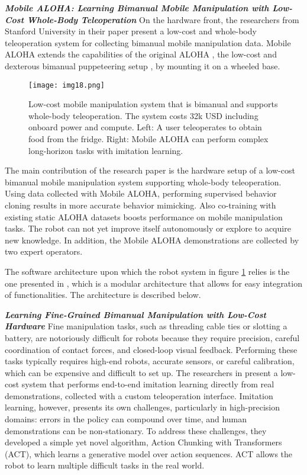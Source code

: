 \textbf{\textit{Mobile ALOHA: Learning Bimanual Mobile Manipulation with
		Low-Cost Whole-Body Teleoperation}} \quad
On the hardware front, the researchers from Stanford University in their paper \cite{tony2024mobile}
present a low-cost and whole-body teleoperation system for collecting bimanual mobile manipulation
data. Mobile ALOHA extends the capabilities of the original ALOHA \cite{tony2023bimanual},
the low-cost and dexterous bimanual puppeteering setup \cite{tony2023bimanual},
by mounting it on a wheeled base.

\begin{figure}[ht]
	\centering
	\texttt{[image: img18.png]}
	\captionsetup{width=1\linewidth}
	\caption{Low-cost mobile manipulation system that is bimanual and supports whole-body teleoperation.
		The system costs 32k USD including onboard power and compute. Left: A user teleoperates to
		obtain food from the fridge. Right: Mobile ALOHA can perform complex long-horizon tasks
		with imitation learning. \cite{tony2024mobile}}
	\label{fig:img18}
\end{figure}

The main contribution of the research paper \cite{tony2024mobile} is the hardware setup of
a low-cost bimanual mobile manipulation system supporting whole-body teleoperation.
Using data collected with Mobile ALOHA, performing supervised behavior cloning results in more
accurate behavior mimicking. Also co-training with existing static ALOHA datasets \cite{tony2023bimanual}
boosts performance on mobile manipulation tasks.
The robot can not yet improve itself autonomously or explore to acquire new knowledge.
In addition, the Mobile ALOHA demonstrations are collected by two expert operators.

The software architecture upon which the robot system in figure \ref{fig:img18} relies
is the one presented in \cite{tony2023bimanual}, which is a modular architecture
that allows for easy integration of functionalities. The architecture is described below.

\textbf{\textit{Learning Fine-Grained Bimanual Manipulation with
		Low-Cost Hardware}} \quad
Fine manipulation tasks, such as threading cable ties or slotting a battery, are notoriously difficult
for robots because they require precision, careful coordination of contact forces, and closed-loop
visual feedback. Performing these tasks typically requires high-end robots, accurate sensors,
or careful calibration, which can be expensive and difficult to set up.
The researchers in \cite{tony2023bimanual} present a low-cost system that performs
end-to-end imitation learning directly from real demonstrations, collected with a custom
teleoperation interface. Imitation learning, however, presents its own challenges,
particularly in high-precision domains: errors in the policy can compound over time,
and human demonstrations can be non-stationary. To address these challenges, they developed a simple yet
novel algorithm, Action Chunking with Transformers (ACT), which learns a generative
model over action sequences. ACT allows the robot to learn multiple difficult tasks in the real world.

